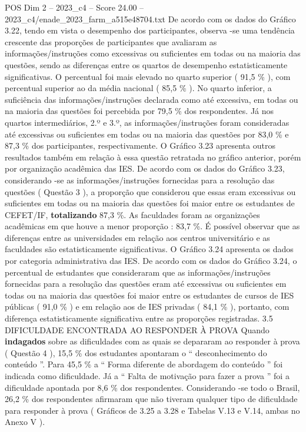 \begin{textsample}{POS Dim 2 – 2023\_c4 – Score 24.00 – 2023\_c4/enade\_2023\_farm\_a515e48704.txt}
De acordo com os dados do Gráfico 3.22, tendo em vista o desempenho dos participantes, observa -se uma tendência crescente das proporções de participantes que avaliaram as informações/instruções como excessivas ou suficientes em todas ou na maioria das questões, sendo as diferenças entre os quartos de desempenho estatisticamente significativas.
O percentual foi mais elevado no quarto superior ( 91,5 \% ), com percentual superior ao da média nacional ( 85,5 \% ).
No quarto inferior, a suficiência das informações/instruções declarada como até excessiva, em todas ou na maioria das questões foi percebida por 79,5 \% dos respondentes.
Já nos quartos intermediários, 2.º e 3.º, as informações/instruções foram consideradas até excessivas ou suficientes em todas ou na maioria das questões por 83,0 \% e 87,3 \% dos participantes, respectivamente.
O Gráfico 3.23 apresenta outros resultados também em relação à essa questão retratada no gráfico anterior, porém por organização acadêmica das IES.
De acordo com os dados do Gráfico 3.23, considerando -se as informações/instruções fornecidas para a resolução das questões ( Questão 3 ), a proporção que considerou que essas eram excessivas ou suficientes em todas ou na maioria das questões foi maior entre os estudantes de CEFET/IF, \textbf{totalizando} 87,3 \%.
As faculdades foram as organizações acadêmicas em que houve a menor proporção : 83,7 \%.
É possível observar que as diferenças entre as universidades em relação aos centros universitário e as faculdades são estatisticamente significativas.
O Gráfico 3.24 apresenta os dados por categoria administrativa das IES.
De acordo com os dados do Gráfico 3.24, o percentual de estudantes que consideraram que as informações/instruções fornecidas para a resolução das questões eram até excessivas ou suficientes em todas ou na maioria das questões foi maior entre os estudantes de cursos de IES públicas ( 91,0 \% ) e em relação aos de IES privadas ( 84,1 \% ), portanto, com diferença estatisticamente significativa entre as proporções registradas. 3.5 DIFICULDADE ENCONTRADA AO RESPONDER À PROVA Quando \textbf{indagados} sobre as dificuldades com as quais se depararam ao responder à prova ( Questão 4 ), 15,5 \% dos estudantes apontaram o “ desconhecimento do conteúdo ”.
Para 45,5 \% a “ Forma diferente de abordagem do conteúdo ” foi indicada como dificuldade.
Já a “ Falta de motivação para fazer a prova ” foi a dificuldade apontada por 8,6 \% dos respondentes.
Considerando -se todo o Brasil, 26,2 \% dos respondentes afirmaram que não tiveram qualquer tipo de dificuldade para responder à prova ( Gráficos de 3.25 a 3.28 e Tabelas V.13 e V.14, ambas no Anexo V ).

\end{textsample}
